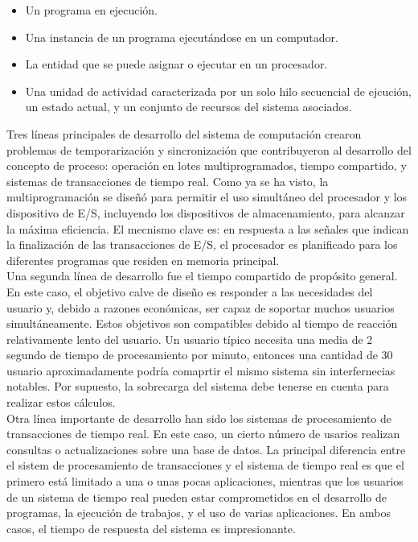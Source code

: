 \documentclass{article}
\begin{document}
				\begin{itemize}
				\item Un programa en ejecución.
				\item Una instancia de un programa ejecutándose en un computador.
				\item La entidad que se puede asignar o ejecutar en un procesador.
				\item Una unidad de actividad caracterizada por un solo hilo secuencial de ejcución, un estado actual, y un conjunto de recursos del sistema asociados.
				\end{itemize}
				
				Tres líneas principales de desarrollo del sistema de computación crearon problemas de temporarización y sincronización que contribuyeron al desarrollo del concepto de proceso: operación en lotes multiprogramados, tiempo compartido, y sistemas de transacciones de tiempo real. Como ya se ha visto, la multiprogramación se diseñó para permitir el uso simultáneo del procesador y los dispositivo de E/S, incluyendo los dispositivos de almacenamiento, para alcanzar la máxima eficiencia. El mecnismo clave es: en respuesta a las señales que indican la finalización de las transacciones de E/S, el procesador es planificado para los diferentes programas que residen en memoria principal. \\
				
				Una segunda línea de desarrollo fue el tiempo compartido de propósito general. En este caso, el objetivo calve de diseño es responder a las necesidades del usuario y, debido a razones económicas, ser capaz de soportar muchos usuarios simultáneamente. Estos objetivos son compatibles debido al tiempo de reacción relativamente lento del usuario. Un usuario típico necesita una media de 2 segundo de tiempo de procesamiento por minuto, entonces una cantidad de 30 usuario aproximadamente podría comaprtir el mismo sistema sin interfernecias notables. Por supuesto, la sobrecarga del sistema debe tenerse en cuenta para realizar estos cálculos. \\
				
				Otra línea importante de desarrollo han sido los sistemas de procesamiento de transacciones de tiempo real. En este caso, un cierto número de usarios realizan consultas o actualizaciones sobre una base de datos. La principal diferencia entre el sistem de procesamiento de transacciones y el sistema de tiempo real es que el primero está limitado a una o unas pocas aplicaciones, mientras que los usuarios de un sistema de tiempo real pueden estar comprometidos en el desarrollo de programas, la ejecución de trabajos, y el uso de varias aplicaciones. En ambos casos, el tiempo de respuesta del sistema es impresionante. \\
				
\end{document}
